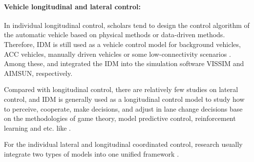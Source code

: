 \documentclass[a4paper,fleqn]{cas-sc}
\begin{document}
\paragraph{\textbf{Vehicle longitudinal and lateral control:}}
In individual longitudinal control, scholars tend to design the control algorithm of the automatic vehicle based on physical methods or data-driven methods. Therefore, IDM is still used as a vehicle control model for background vehicles, ACC vehicles, manually driven vehicles or some low-connectivity scenarios \citep{juPredictiveCruiseControllerElectric2023a,kamal_efficient_2016,kamalLookAheadDrivingSchemesEfficient2022a,li_deep_2022,li_effect_2015,liu_semantic_2023,liu_potential_2023,liuSpatiotemporalTrajectoryPlanningAutonomous2024a,luLearningDriverSpecificBehaviorOvertaking2018a,ma_energetic_2022,maPersonalizedDrivingBehaviorsFuel2022a,manolis_real_2020,shiConnectedAutomatedVehicleCooperative2021b,shiDeepReinforcementLearningBased2023b,suo_model-free_2024,tangHighwayDecisionMakingMotionPlanning2022a,tas_making_2018,toghi_social_2022,valiente_prediction-aware_2024,wegener_automated_2021,wuFlowModularLearningFramework2022a,wu_hybrid_2023,yan_unified_2023,yangIsolatedIntersectionControlVarious2016a,yuAssessmentDynamicPlatoonInformation2023a,yuanPredictiveEnergyManagementStrategy2019,zhang_stackelberg_2024,zhangNoMoreRoadBullying2023a,zhou_development_2020,milanesModelingCooperativeAutonomousAdaptive2014b,fernandes_platooning_2012,vivekCyberphysicalRisksHackedInternetconnected2019a}. Among these, \cite{zhangNoMoreRoadBullying2023a} and \cite{manolis_real_2020} integrated the IDM into the simulation software VISSIM and AIMSUN, respectively.

Compared with longitudinal control, there are relatively few studies on lateral control, and IDM is generally used as a longitudinal control model to study how to perceive, cooperate, make decisions, and adjust in lane change decisions base on the methodologies of game theory, model predictive control, reinforcement learning and etc. like \citep{chen_adversarial_2022,gongGameTheoryBasedDecisionMakingIterative2023a,guIntegratedEcoDrivingAutomationIntelligent2022a,hwang_autonomous_2022,li_bounded_2024,liuMultistepCooperativeLaneChange2024a,liu_interaction-aware_2023,scheel_recurrent_2022,sheng_cooperation-aware_2023,sunberg_improving_2022,wangModelingBoundedRationalityDiscretionary2022a,zhang_game_2020}.

For the individual lateral and longitudinal coordinated control, research usually integrate two types of models into one unified framework \citep{kanagaraj_self-driven_2018,li_developing_2023,mullakkal-babu_hybrid_2021}.
\end{document}
